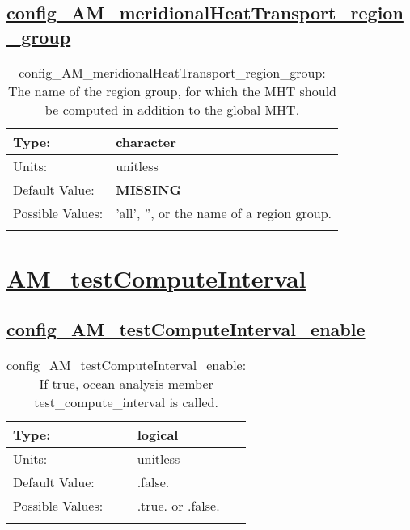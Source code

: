 \subsection[config\_AM\_meridionalHeatTransport\_region\_group]{\hyperref[sec:nm_tab_AM_meridionalHeatTransport]{config\_AM\_meridionalHeatTransport\_region\_group}}
\label{subsec:nm_sec_config_AM_meridionalHeatTransport_region_group}
\begin{center}
\begin{longtable}{| p{2.0in} || p{4.0in} |}
    \hline
    Type: & character \\
    \hline
    Units: & \si{unitless} \\
    \hline
    Default Value: & {\bf \color{red} MISSING} \\
    \hline
    Possible Values: & 'all', '', or the name of a region group. \\
    \hline
    \caption{config\_AM\_meridionalHeatTransport\_region\_group: The name of the region group, for which the MHT should be computed in addition to the global MHT.}
\end{longtable}
\end{center}
\section[AM\_testComputeInterval]{\hyperref[sec:nm_tab_AM_testComputeInterval]{AM\_testComputeInterval}}
\label{sec:nm_sec_AM_testComputeInterval}
\subsection[config\_AM\_testComputeInterval\_enable]{\hyperref[sec:nm_tab_AM_testComputeInterval]{config\_AM\_testComputeInterval\_enable}}
\label{subsec:nm_sec_config_AM_testComputeInterval_enable}
\begin{center}
\begin{longtable}{| p{2.0in} || p{4.0in} |}
    \hline
    Type: & logical \\
    \hline
    Units: & \si{unitless} \\
    \hline
    Default Value: & .false. \\
    \hline
    Possible Values: & .true. or .false. \\
    \hline
    \caption{config\_AM\_testComputeInterval\_enable: If true, ocean analysis member test\_compute\_interval is called.}
\end{longtable}
\end{center}
